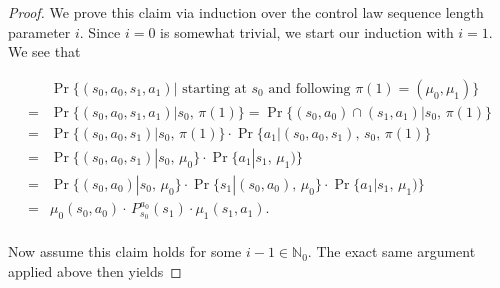 \documentclass[11pt]{article} %
\begin{document}
\begin{proof}

We prove this claim via induction over the control law sequence length parameter $i$. Since $i=0$ is somewhat trivial, we start our induction with $i=1$. We see that

\begin{equation}\label{controlLawTrajIA}
	\begin{array}{ll}
			& \Pr\{(s_0,a_0, s_1, a_1) | \text{ starting at } s_0 \text{ and following } \pi(1) = (\mu_0,\mu_1)\} \\
		=	& \Pr\{(s_0,a_0, s_1, a_1) | s_0, \, \pi(1)\} = \Pr\{(s_0,a_0) \cap (s_1,a_1) | s_0, \, \pi(1)\} \\
		=	& \Pr\{(s_0,a_0, s_1) | s_0, \, \pi(1)\} \cdot \Pr\{a_1 |(s_0,a_0,s_1), \, s_0, \, \pi(1)\} \\
		=	& \Pr\{(s_0,a_0,s_1) | s_0, \, \mu_0\} \cdot \Pr\{a_1 | s_1, \, \mu_1)\} \\
		=	& \Pr\{(s_0,a_0) | s_0, \, \mu_0\} \cdot \Pr\{s_1 | (s_0,a_0), \, \mu_0 \} \cdot \Pr\{a_1 | s_1, \, \mu_1)\} \\
		=	& \mu_0(s_0,a_0) \cdot \, P^{a_0}_{s_0}(s_1) \cdot \mu_1(s_1,a_1). \\
	\end{array}
\end{equation}

Now assume this claim holds for some $i-1 \in \mathbb{N}_0$. The exact same argument applied above then yields


\end{proof}
\end{document}
